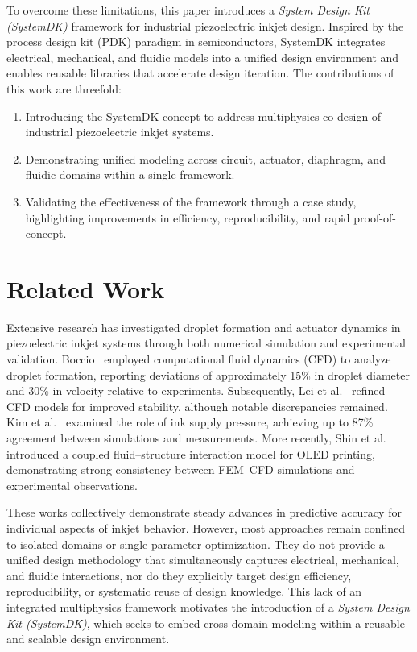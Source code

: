 \documentclass[conference]{IEEEtran}
\begin{document}
To overcome these limitations, this paper introduces a \emph{System Design Kit (SystemDK)} framework for industrial piezoelectric inkjet design. 
Inspired by the process design kit (PDK) paradigm in semiconductors, SystemDK integrates electrical, mechanical, and fluidic models into a unified design environment and enables reusable libraries that accelerate design iteration. 
The contributions of this work are threefold:
\begin{enumerate}
  \item Introducing the SystemDK concept to address multiphysics co-design of industrial piezoelectric inkjet systems.
  \item Demonstrating unified modeling across circuit, actuator, diaphragm, and fluidic domains within a single framework.
  \item Validating the effectiveness of the framework through a case study, highlighting improvements in efficiency, reproducibility, and rapid proof-of-concept.
\end{enumerate}

\section{Related Work}
Extensive research has investigated droplet formation and actuator dynamics in piezoelectric inkjet systems through both numerical simulation and experimental validation. 
Boccio~\cite{boccio2003} employed computational fluid dynamics (CFD) to analyze droplet formation, reporting deviations of approximately 15\% in droplet diameter and 30\% in velocity relative to experiments. 
Subsequently, Lei et al.~\cite{lei2012} refined CFD models for improved stability, although notable discrepancies remained. 
Kim et al.~\cite{kim2022} examined the role of ink supply pressure, achieving up to 87\% agreement between simulations and measurements. 
More recently, Shin et al.~\cite{shin2025} introduced a coupled fluid--structure interaction model for OLED printing, demonstrating strong consistency between FEM--CFD simulations and experimental observations.

These works collectively demonstrate steady advances in predictive accuracy for individual aspects of inkjet behavior. 
However, most approaches remain confined to isolated domains or single-parameter optimization. 
They do not provide a unified design methodology that simultaneously captures electrical, mechanical, and fluidic interactions, nor do they explicitly target design efficiency, reproducibility, or systematic reuse of design knowledge. 
This lack of an integrated multiphysics framework motivates the introduction of a \emph{System Design Kit (SystemDK)}, which seeks to embed cross-domain modeling within a reusable and scalable design environment.
\end{document}

